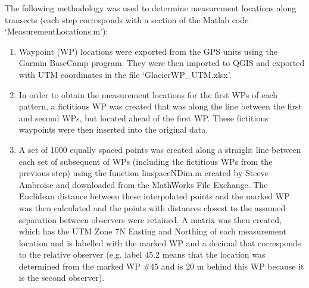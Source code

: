 \documentclass{sfuthesis}
\begin{document}
\begin{appendices}
 The following methodology was used to determine measurement locations along transects (each step corresponds with a section of the Matlab code `MeasurementLocations.m'): 
\begin{enumerate}
	\item Waypoint (WP) locations were exported from the GPS units using the Garmin BaseCamp program. They were then imported to QGIS and exported with UTM coordinates in the file `GlacierWP\_UTM.xlsx'. 
	\item In order to obtain the measurement locations for the first WPs of each pattern, a fictitious WP was created that was along the line between the first and second WPs, but located ahead of the first WP. These fictitious waypoints were then inserted into the original data. 
	\item A set of 1000 equally spaced points was created along a straight line between each set of subsequent of WPs (including the fictitious WPs from the previous step) using the function linspaceNDim.m created by Steeve Ambroise and downloaded from the MathWorks File Exchange. The Euclidean distance between these interpolated points and the marked WP was then calculated and the points with distances closest to the assumed separation between observers were retained. A matrix was then created, which has the UTM Zone 7N Easting and Northing of each measurement location and is labelled with the marked WP and a decimal that corresponds to the relative observer (e.g. label 45.2 means that the location was determined from the marked WP \#45 and is 20 m behind this WP because it is the second observer). 
\end{enumerate}


\end{appendices}
\end{document}
